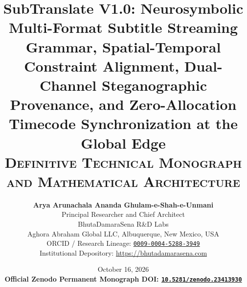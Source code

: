 \documentclass[11pt,a4paper,reqno]{article}
\newcommand{\zenodo}[1]{\href{https://doi.org/10.5281/zenodo.#1}{\nolinkurl{10.5281/zenodo.#1}}}
\theoremstyle{definition}
\theoremstyle{remark}
\begin{document}
\title{\textbf{\LARGE SubTranslate V1.0: Neurosymbolic Multi-Format Subtitle Streaming Grammar, Spatial-Temporal Constraint Alignment, Dual-Channel Steganographic Provenance, and Zero-Allocation Timecode Synchronization at the Global Edge}\\[0.6ex]
\large\textsc{Definitive Technical Monograph and Mathematical Architecture}}

\author{
    \textbf{Arya Arunachala Ananda Ghulam-e-Shah-e-Unmani}\\
    \small Principal Researcher and Chief Architect\\
    \small BhutaDamaraSena R\&D Labs\\
    \small Aghora Abraham Global LLC, Albuquerque, New Mexico, USA\\
    \small ORCID / Research Lineage: \href{https://orcid.org/0009-0004-5288-3949}{\texttt{0009-0004-5288-3949}}\\
    \small Institutional Depository: \url{https://bhutadamarasena.com}
}

\date{October 16, 2026\\[0.5em]
\small\textbf{Official Zenodo Permanent Monograph DOI: \zenodo{23413930}}}

\maketitle
\end{document}
